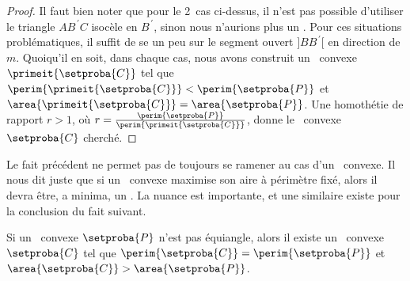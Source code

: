 \begin{proof}
    Il faut bien noter que pour le 2\ieme\ cas ci-dessus, il n'est pas possible d'utiliser le triangle $AB^{\,\prime}C$ isocèle en $B^{\,\prime}$, sinon nous n'aurions plus un \ngone.
    Pour ces situations problématiques, il suffit de se  un peu sur le segment ouvert $]BB^{\,\prime}[$ en direction de $m$.
    Quoiqu'il en soit, dans chaque cas, nous avons construit un \ngone\ convexe $\primeit{\setproba{C}}$ tel que
    $\perim{\primeit{\setproba{C}}} < \perim{\setproba{P}}$
    et
    $\area{\primeit{\setproba{C}}} = \area{\setproba{P}}$.
    Une homothétie de rapport $r > 1$, où $r = \frac{ \perim{\setproba{P}} }{ \perim{\primeit{\setproba{C}}} }$, donne le \ngone\ convexe $\setproba{C}$ cherché.
\end{proof}


\begin{remark}
    Le fait précédent ne permet pas de toujours se ramener au cas d'un \nequi\ convexe. Il nous dit juste que si un \ngone\ convexe maximise son aire à périmètre fixé, alors il devra être, a minima, un \nequi. La nuance est importante, et une similaire existe pour la conclusion du fait suivant.
\end{remark}




\begin{fact} \label{must-be-iso}
    Si un \nequi\ convexe $\setproba{P}$ n'est pas équiangle,
    alors il existe un \ngone\ convexe $\setproba{C}$ tel que
    $\perim{\setproba{C}} = \perim{\setproba{P}}$
    et
    $\area{\setproba{C}} > \area{\setproba{P}}$.
\end{fact}


